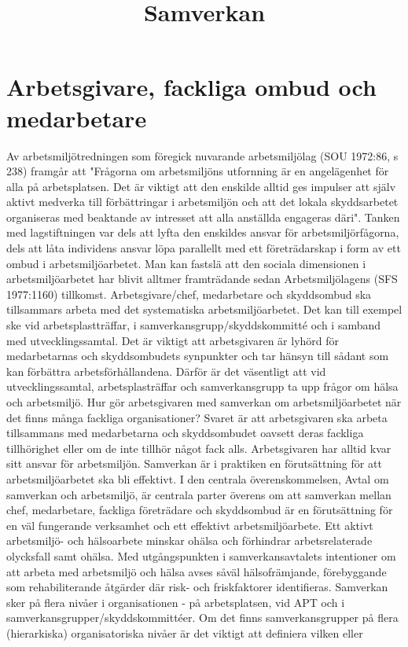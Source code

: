 \title{
Samverkan
}
\section*{Arbetsgivare, fackliga ombud och medarbetare}
Av arbetsmiljötredningen som föregick nuvarande arbetsmiljölag (SOU 1972:86, s 238) framgår att "Frågorna om arbetsmiljöns utfornning är en angelägenhet för alla på arbetsplatsen. Det är viktigt att den enskilde alltid ges impulser att själv aktivt medverka till förbättringar i arbetsmiljön och att det lokala skyddsarbetet organiseras med beaktande av intresset att alla anställda engageras däri".
Tanken med lagstiftningen var dels att lyfta den enskildes ansvar för arbetsmiljörfågorna, dels att låta individens ansvar löpa parallellt med ett företrädarskap i form av ett ombud i arbetsmiljöarbetet. Man kan fastslä att den sociala dimensionen i arbetsmiljöarbetet har blivit alltmer framträdande sedan Arbetsmiljölagens (SFS 1977:1160) tillkomst.
Arbetsgivare/chef, medarbetare och skyddsombud ska tillsammars arbeta med det systematiska arbetsmiljöarbetet. Det kan till exempel ske vid arbetsplastträffar, i samverkansgrupp/skyddskommitté och i samband med utvecklingssamtal. Det är viktigt att arbetsgivaren är lyhörd för medarbetarnas och skyddsombudets synpunkter och tar hänsyn till sådant som kan förbättra arbetsförhållandena. Därför är det väsentligt att vid utvecklingssamtal, arbetsplasträffar och samverkansgrupp ta upp frågor om hälsa och arbetsmiljö.
Hur gör arbetsgivaren med samverkan om arbetsmiljöarbetet när det finns många fackliga organisationer? Svaret är att arbetsgivaren ska arbeta tillsammans med medarbetarna och skyddsombudet oavsett deras fackliga tillhörighet eller om de inte tillhör något fack alls.
Arbetsgivaren har alltid kvar sitt ansvar för arbetsmiljön. Samverkan är i praktiken en förutsättning för att arbetsmiljöarbetet ska bli effektivt.
I den centrala överenskommelsen, Avtal om samverkan och arbetsmiljö, är centrala parter överens om att samverkan mellan chef, medarbetare, fackliga företrädare och skyddsombud är en förutsättning för en väl fungerande verksamhet och ett effektivt arbetsmiljöarbete. Ett aktivt arbetsmiljö- och hälsoarbete minskar ohälsa och förhindrar arbetsrelaterade olycksfall samt ohälsa. Med utgångspunkten i samverkansavtalets intentioner om att arbeta med arbetsmiljö och hälsa avses såväl hälsofrämjande, förebyggande som rehabiliterande åtgärder där risk- och friskfaktorer identifieras.
Samverkan sker på flera nivåer i organisationen - på arbetsplatsen, vid APT och i samverkansgrupper/skyddskommittéer. Om det finns samverkansgrupper på flera (hierarkiska) organisatoriska nivåer är det viktigt att definiera vilken eller

